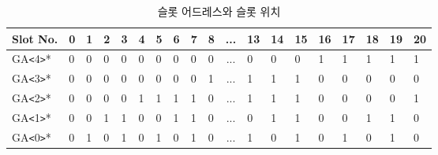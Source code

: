 %
%
\begin{table}[htbp]
\caption{슬롯 어드레스와 슬롯 위치}\label{table:ga}
   \begin{center}
   \begin{tabular}{|l|l l l l l l l l l c l l l l l l l l|} \hline
	Slot No. & 0&1&2&3&4&5&6&7&8&...&13&14&15&16&17&18&19&20 \\
\hline \hline
	GA{\tt <}4{\tt >}* &0&0&0&0&0&0&0&0&0&...&0&0&0&1&1&1&1&1 \\
	GA{\tt <}3{\tt >}* &0&0&0&0&0&0&0&0&1&...&1&1&1&0&0&0&0&0 \\
	GA{\tt <}2{\tt >}* &0&0&0&0&1&1&1&1&0&...&1&1&1&0&0&0&0&1 \\
	GA{\tt <}1{\tt >}* &0&0&1&1&0&0&1&1&0&...&0&1&1&0&0&1&1&0 \\
	GA{\tt <}0{\tt >}* &0&1&0&1&0&1&0&1&0&...&1&0&1&0&1&0&1&0 \\
\hline
   \end{tabular}
   \end{center}
\end{table}
%
%
